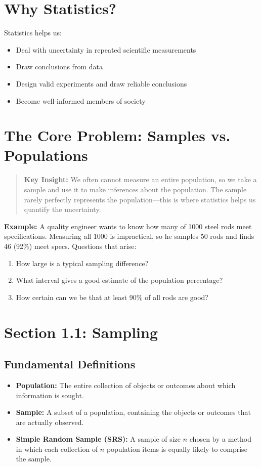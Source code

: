 \documentclass[11pt]{article}
\begin{document}
\section*{Why Statistics?}
Statistics helps us:
\begin{itemize}[nosep]
    \item Deal with uncertainty in repeated scientific measurements
    \item Draw conclusions from data
    \item Design valid experiments and draw reliable conclusions
    \item Become well-informed members of society
\end{itemize}

\section*{The Core Problem: Samples vs. Populations}
\begin{quote}
\textbf{Key Insight:} We often cannot measure an entire population, so we take a sample and use it to make inferences about the population. The sample rarely perfectly represents the population—this is where statistics helps us quantify the uncertainty.
\end{quote}

\textbf{Example:} A quality engineer wants to know how many of 1000 steel rods meet specifications. Measuring all 1000 is impractical, so he samples 50 rods and finds 46 (92\%) meet specs. Questions that arise:
\begin{enumerate}[nosep]
    \item How large is a typical sampling difference?
    \item What interval gives a good estimate of the population percentage?
    \item How certain can we be that at least 90\% of all rods are good?
\end{enumerate}

\section*{Section 1.1: Sampling}
\subsection*{Fundamental Definitions}
\begin{itemize}[nosep]
    \item \textbf{Population:} The entire collection of objects or outcomes about which information is sought.
    \item \textbf{Sample:} A subset of a population, containing the objects or outcomes that are actually observed.
    \item \textbf{Simple Random Sample (SRS):} A sample of size \(n\) chosen by a method in which each collection of \(n\) population items is equally likely to comprise the sample.
\end{itemize}
\end{document}
